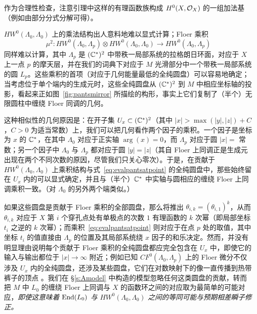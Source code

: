 作为合理性检查，注意引理中这样的有理函数族构成 $H^0(X,\mathcal{O}_X)$ 的一组加法基（例如由部分分式分解可得）。

$HW^0(\Lambda_0,\Lambda_0)$ 上的乘法结构出人意料地难以显式计算；Floer 乘积
\begin{equation}\label{eq:evalpantsatpoint}
\mu^2:HW^0(\Lambda_0,\Lambda_p)\otimes HW^0(\Lambda_0,\Lambda_0)\to HW^0(\Lambda_0,\Lambda_p)
\end{equation}
同样难以计算，其中 $\Lambda_p$ 是 $(\mathbb{C}^*)^2$ 中带秩一局部系统的拉格朗日环面，对应于 $X$ 上一点 $p$ 的摩天层，并在我们的词典下对应于 $M$ 光滑部分中一个带秩一局部系统的圆 $L_p$。这些乘积的首项（对应于几何能量最低的全纯圆盘）可以容易地确定；当考虑位于单个端内的生成元时，这些全纯圆盘从 $(\mathbb{C}^*)^2$ 到 $M$ 中相应坐标轴的投影，看起来正如图~\ref{fig:pantsmirror} 所描绘的构形，事实上它们复制了（半个）无限圆柱中缠绕 Floer 同调的几何。

这种相似性的几何原因是：在开子集 $U_x\subset(\mathbb{C}^*)^2$（其中 $|x|>\max(|y|,|z|)+C$，$C>0$ 为适当常数）上，我们可以把几何看作两个因子的乘积。一个因子是坐标为 $x$ 的 $\mathbb{C}^*$，在其中 $\Lambda_0$ 对应于正实轴 $\arg(x)=0$，而 $\Lambda_p$ 对应于圆 $|x|=$ 常数；另一个因子中 $\Lambda_0$ 与 $\Lambda_p$ 都对应于圆 $|y|=|z|$（其自 Floer 上同调正是生成元出现在两个不同次数的原因，尽管我们只关心零次）。于是，在贡献于 $HW^0(\Lambda_0,\Lambda_0)$ 上乘积结构与式~\eqref{eq:evalpantsatpoint} 的全纯圆盘中，那些始终留在 $U_x$ 内的可以显式确定，并且与（半个）$\mathbb{C}^*$ 中实轴与圆相应的缠绕 Floer 上同调乘积一致。（对 $\Lambda_0$ 的另外两个端类似。）

如果这些圆盘是贡献于 Floer 乘积的全部圆盘，那么将推出 $\theta_{i,k}=(\theta_{i,1})^k$，从而 $\theta_{i,k}$ 对应于 $X$ 第 $i$ 个穿孔点处有单极点的次数 $1$ 有理函数的 $k$ 次幂（即局部坐标 $t_i$ 之逆的 $k$ 次幂）；而乘积~\eqref{eq:evalpantsatpoint} 则对应于在点 $p$ 处的取值，其中坐标 $t_i$ 的值直接由 $\Lambda_p$ 的位置及其局部系统绕 $x$ 因子的和乐决定。然而，并没有明显理由说明每个贡献于 Floer 乘积的全纯圆盘都应完全包含在 $U_x$ 中，即使它的输入与输出都位于 $|x|\to\infty$ 附近；例如已知 $CF^0(\Lambda_0,\Lambda_p)$ 上的 Floer 微分不仅涉及 $U_x$ 内的全纯圆盘，还涉及某些圆盘，它们在对数映射下的像一直传播到热带裤子的顶点 \cite{Hicks}。我们在 §\ref{s:Amodel} 中构造的模型忽略任何这类圆盘的贡献，转而把 $M$ 中 $L_0$ 的缠绕 Floer 上同调与 $X$ 的函数环之间的对应取为最简单的可能对应，\emph{即使这意味着 $\operatorname{End}(L_0)$ 与 $HW^0(\Lambda_0,\Lambda_0)$ 之间的等同可能与预期相差瞬子修正。}

